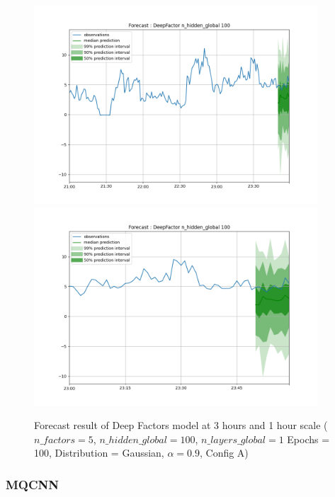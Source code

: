 \documentclass[a4paper, 12pt]{article}
\begin{document}
\begin{figure}[!h]
    \centering
    \includegraphics[width=400px]{plots/forecast/a/DeepFactor/n_hidden_global/100/180.png}
    \includegraphics[width=400px]{plots/forecast/a/DeepFactor/n_hidden_global/100/60.png}
    \caption{Forecast result of Deep Factors model at 3 hours and 1 hour scale ($n\_factors = 5$, $n\_hidden\_global = 100$, $n\_layers\_global = 1$ Epochs = 100, Distribution = Gaussian, $\alpha = 0.9$, Config A)}
    \label{fig:comp_deepfactor_n_hidden_global}
\end{figure}

\subsubsection{MQCNN} \label{comp_mqcnn}
\end{document}

